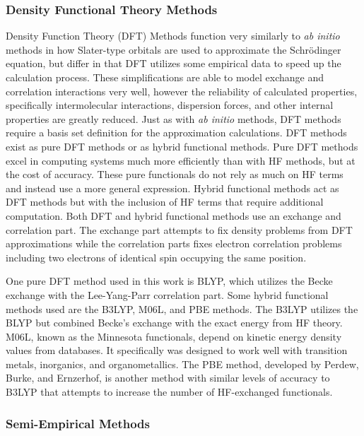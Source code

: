 \subsubsection{Density Functional Theory Methods}

Density Function Theory (DFT) Methods function very similarly to \textit{ab initio} methods in how Slater-type orbitals are used to approximate the Schr\"{o}dinger equation, but differ in that DFT utilizes some empirical data to speed up the calculation process.\cite{DFT}
These simplifications are able to model exchange and correlation interactions very well, however the reliability of calculated properties, specifically intermolecular interactions, dispersion forces, and other internal properties are greatly reduced.
Just as with \textit{ab initio} methods, DFT methods require a basis set definition for the approximation calculations.
DFT methods exist as pure DFT methods or as hybrid functional methods.
Pure DFT methods excel in computing systems much more efficiently than with HF methods, but at the cost of accuracy.
These pure functionals do not rely as much on HF terms and instead use a more general expression.
Hybrid functional methods act as DFT methods but with the inclusion of HF terms that require additional computation.
Both DFT and hybrid functional methods use an exchange and correlation part.\cite{DFT}
The exchange part attempts to fix density problems from DFT approximations while the correlation parts fixes electron correlation problems including two electrons of identical spin occupying the same position.


One pure DFT method used in this work is BLYP, which utilizes  the Becke exchange with the Lee-Yang-Parr correlation part.\cite{BLYP}
Some hybrid functional methods used are the B3LYP, M06L, and PBE methods.
The B3LYP utilizes the BLYP but combined Becke's exchange with the exact energy from HF theory.
M06L, known as the Minnesota functionals, depend on kinetic energy density values from databases.
It specifically was designed to work well with transition metals, inorganics, and organometallics.\cite{M06L}
The PBE method, developed by Perdew, Burke, and Ernzerhof,  is another method with similar levels of accuracy to B3LYP that attempts to increase the number of HF-exchanged functionals.\cite{PBE}

\subsubsection{Semi-Empirical Methods}

